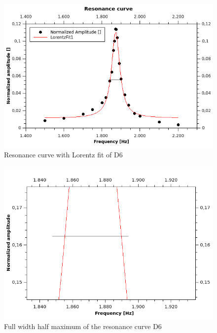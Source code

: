 \documentclass[12pt,a4paper]{article}
\begin{document}
\begin{figure}[H]
	\centering
	\includegraphics[scale=0.8]{../figures/Resonanzkurve.png}
	\caption{Resonance curve with Lorentz fit of D6}
	\label{fig:resonanzkurve}
\end{figure}

\begin{figure}[H]
	\centering
	\includegraphics[scale=0.8]{../figures/ResonanzkurveHalbwertsbreite.png}
	\caption{Full width half maximum of the resonance curve D6}
	\label{fig:resonanzkurvehmfuw}
\end{figure}
\end{document}

